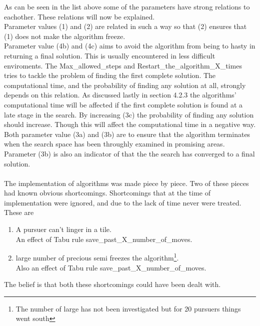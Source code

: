 \begin{enumerate}
\end{enumerate} 
As can be seen in the list above some of the parameters have strong relations to eachother. These relations will now be explained. \\
Parameter values (1) and (2) are related in such a way so that (2) ensures that (1) does not make the algorithm freeze. \\
Parameter value (4b) and (4c) aims to avoid the algorithm from being to hasty in returning a final solution. This is usually encountered in less difficult enviroments. The Max\_allowed\_steps and Restart\_the\_algorithm\_X\_times tries to tackle the problem of finding the first complete solution. The computational time, and the probability of finding any solution at all, strongly depends on this relation. As discussed lastly in section 4.2.3 the algorithms' computational time will be affected if the first complete solution is found at a late stage in the search. By increasing (3c) the probability of finding any solution should increase. Though this will affect the computational time in a negative way. Both parameter value (3a) and (3b) are to ensure that the algorithm terminates when the search space has been throughly examined in promising areas.
Parameter (3b) is also an indicator of that the the search has converged to a final solution.\\
\\
The implementation of algorithms was made piece by piece. Two of these pieces had known obvious shortcomings. Shortcomings that at the time of implementation were ignored, and due to the lack of time never were treated. These are\\
\begin{enumerate}
\item{} A pursuer can’t linger in a tile. \vspace{0,1cm}\\
 An effect of Tabu rule save\_past\_X\_number\_of\_moves.
\item{} large number of precious semi freezes the algorithm\footnote{ The number of large has not been investigated but for 20 pursuers things went south }. \vspace{0,1cm}\\
Also an effect of Tabu rule save\_past\_X\_number\_of\_moves.
\end{enumerate} 
The belief is that both these shortcomings could have been dealt with.

